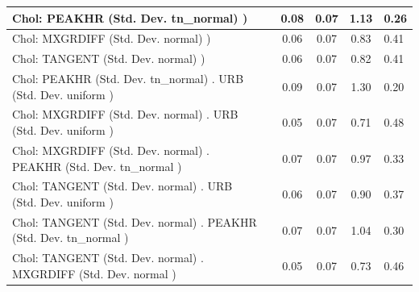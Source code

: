\begin{table}
\begin{center}
\begin{tabular}{|l|l|c|c|c|l|}
			\hline
			 Chol: PEAKHR (Std. Dev. tn_normal) ) &  & 0.08 & 0.07 & 1.13 & 0.26 \\
			\hline
			 Chol: MXGRDIFF (Std. Dev. normal) ) &  & 0.06 & 0.07 & 0.83 & 0.41 \\
			\hline
			 Chol: TANGENT (Std. Dev. normal) ) &  & 0.06 & 0.07 & 0.82 & 0.41 \\
			\hline
			 Chol: PEAKHR (Std. Dev. tn_normal) . URB (Std. Dev.   uniform ) &  & 0.09 & 0.07 & 1.30 & 0.20 \\
			\hline
			 Chol: MXGRDIFF (Std. Dev. normal) . URB (Std. Dev.   uniform ) &  & 0.05 & 0.07 & 0.71 & 0.48 \\
			\hline
			 Chol: MXGRDIFF (Std. Dev. normal) . PEAKHR (Std. Dev.   tn_normal ) &  & 0.07 & 0.07 & 0.97 & 0.33 \\
			\hline
			 Chol: TANGENT (Std. Dev. normal) . URB (Std. Dev.   uniform ) &  & 0.06 & 0.07 & 0.90 & 0.37 \\
			\hline
			 Chol: TANGENT (Std. Dev. normal) . PEAKHR (Std. Dev.   tn_normal ) &  & 0.07 & 0.07 & 1.04 & 0.30 \\
			\hline
			 Chol: TANGENT (Std. Dev. normal) . MXGRDIFF (Std. Dev.   normal ) &  & 0.05 & 0.07 & 0.73 & 0.46 \\
			\hline
		\end{tabular}
	\end{center}
\end{table}